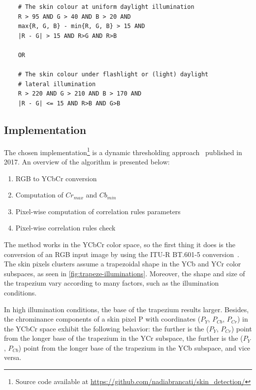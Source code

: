 \begin{minipage}{\linewidth}
\begin{verbatim}
    # The skin colour at uniform daylight illumination
    R > 95 AND G > 40 AND B > 20 AND
    max{R, G, B} - min{R, G, B} > 15 AND
    |R - G| > 15 AND R>G AND R>B
    
    OR
    
    # The skin colour under flashlight or (light) daylight
    # lateral illumination
    R > 220 AND G > 210 AND B > 170 AND
    |R - G| <= 15 AND R>B AND G>B
\end{verbatim}
\end{minipage}


\FloatBarrier
\subsection{Implementation}\label{sec:impl-thresh}

The chosen implementation\footnote{Source code available at \url{https://github.com/nadiabrancati/skin\_detection/}} is a dynamic thresholding approach~\cite{brancati2017human} published in 2017.
An overview of the algorithm is presented below:

\begin{enumerate}[Step 1:]
\item RGB to YCbCr conversion
\item Computation of $Cr_{max}$ and $Cb_{min}$
\item Pixel-wise computation of correlation rules parameters
\item Pixel-wise correlation rules check
\end{enumerate}

The method works in the YCbCr color space, so the first thing it does is the conversion of an RGB input image by using the ITU-R BT.601-5 conversion~\cite{bt2011studio}.
The skin pixels clusters assume a trapezoidal shape in the YCb and YCr color subspaces, as seen in \autoref{fig:trapeze-illuminations}.
Moreover, the shape and size of the trapezium vary according to many factors, such as the illumination conditions. 

In high illumination conditions, the base of the trapezium results larger.
Besides, the chrominance components of a skin pixel P with coordinates ($P_Y$, $P_{Cb}$, $P_{Cr}$) in the YCbCr space exhibit the following behavior: the further is the ($P_Y$, $P_{Cr}$) point from the longer base of the trapezium in the YCr subspace, the further is the ($P_Y$, $P_{Cb}$) point from the longer base of the trapezium in the YCb subspace, and vice versa.

